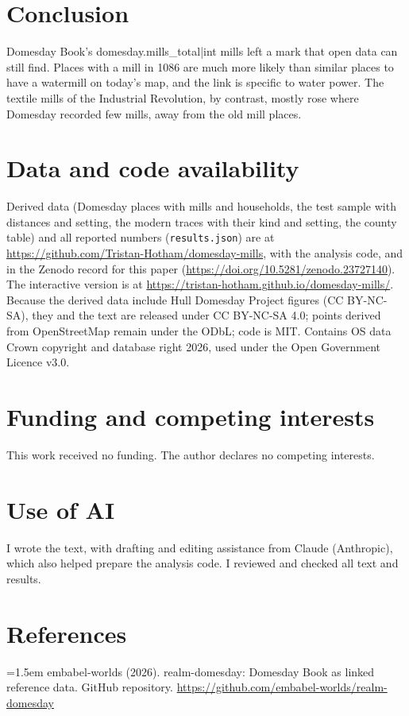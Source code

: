 \documentclass[11pt,a4paper]{article}
\begin{document}
\section{Conclusion}

Domesday Book's {{domesday.mills_total|int}} mills left a mark that open data can still find. Places with a mill in 1086 are much more likely than similar places to have a watermill on today's map, and the link is specific to water power. The textile mills of the Industrial Revolution, by contrast, mostly rose where Domesday recorded few mills, away from the old mill places.

\section*{Data and code availability}

Derived data (Domesday places with mills and households, the test sample with distances and setting, the modern traces with their kind and setting, the county table) and all reported numbers (\texttt{results.json}) are at \url{https://github.com/Tristan-Hotham/domesday-mills}, with the analysis code, and in the Zenodo record for this paper (\url{https://doi.org/10.5281/zenodo.23727140}). The interactive version is at \url{https://tristan-hotham.github.io/domesday-mills/}. Because the derived data include Hull Domesday Project figures (CC BY-NC-SA), they and the text are released under CC BY-NC-SA 4.0; points derived from OpenStreetMap remain under the ODbL; code is MIT. Contains OS data \textcopyright{} Crown copyright and database right 2026, used under the Open Government Licence v3.0.

\section*{Funding and competing interests}

This work received no funding. The author declares no competing interests.

\section*{Use of AI}

I wrote the text, with drafting and editing assistance from Claude (Anthropic), which also helped prepare the analysis code. I reviewed and checked all text and results.

\section*{References}
\small
\setlength{\parskip}{0.35em}
\hangindent=1.5em embabel-worlds (2026). realm-domesday: Domesday Book as linked reference data. GitHub repository. \url{https://github.com/embabel-worlds/realm-domesday}
\end{document}
